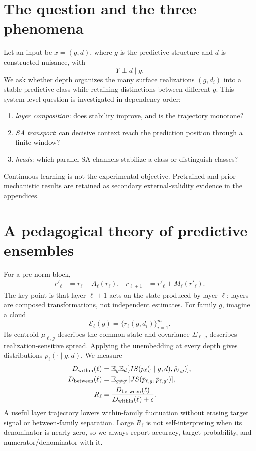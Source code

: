 \documentclass[10pt]{article}
\begin{document}
\section{The question and the three phenomena}
Let an input be $x=(g,d)$, where $g$ is the predictive structure and $d$ is constructed nuisance, with
\begin{equation}Y\perp d\mid g.\end{equation}
We ask whether depth organizes the many surface realizations $(g,d_i)$ into a stable predictive class while retaining distinctions between different $g$.  This system-level question is investigated in dependency order:
\begin{enumerate}
\item \emph{layer composition}: does stability improve, and is the trajectory monotone?
\item \emph{SA transport}: can decisive context reach the prediction position through a finite window?
\item \emph{heads}: which parallel SA channels stabilize a class or distinguish classes?
\end{enumerate}
Continuous learning is not the experimental objective.  Pretrained and prior mechanistic results are retained as secondary external-validity evidence in the appendices.

\section{A pedagogical theory of predictive ensembles}
For a pre-norm block,
\begin{align}r'_\ell&=r_\ell+A_\ell(r_\ell),&r_{\ell+1}&=r'_\ell+M_\ell(r'_\ell).\end{align}
The key point is that layer $\ell+1$ acts on the state produced by layer $\ell$; layers are composed transformations, not independent estimates.  For family $g$, imagine a cloud
\begin{equation}\mathcal E_\ell(g)=\{r_\ell(g,d_i)\}_{i=1}^m.\end{equation}
Its centroid $\mu_{\ell,g}$ describes the common state and covariance $\Sigma_{\ell,g}$ describes realization-sensitive spread.  Applying the unembedding at every depth gives distributions $p_\ell(\cdot\mid g,d)$.  We measure
\begin{align}
D_{\rm within}(\ell)&=\mathbb E_g\mathbb E_d[JS(p_\ell(\cdot\mid g,d),\bar p_{\ell,g})],\\
D_{\rm between}(\ell)&=\mathbb E_{g\ne g'}[JS(\bar p_{\ell,g},\bar p_{\ell,g'})],\\
R_\ell&=\frac{D_{\rm between}(\ell)}{D_{\rm within}(\ell)+\epsilon}.
\end{align}
A useful layer trajectory lowers within-family fluctuation without erasing target signal or between-family separation.  Large $R_\ell$ is not self-interpreting when its denominator is nearly zero, so we always report accuracy, target probability, and numerator/denominator with it.
\end{document}
